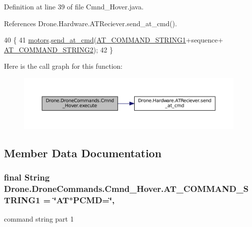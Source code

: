 Definition at line 39 of file Cmnd\+\_\+\+Hover.\+java.



References Drone.\+Hardware.\+A\+T\+Reciever.\+send\+\_\+at\+\_\+cmd().


\begin{DoxyCode}
40     \{
41         \hyperlink{class_drone_1_1_drone_commands_1_1_cmnd___hover_ac1a7b5271784b61c9f20d811fcdac401}{motors}.\hyperlink{class_drone_1_1_hardware_1_1_a_t_reciever_a93352d75209626cf62bde294b35f9120}{send\_at\_cmd}(\hyperlink{class_drone_1_1_drone_commands_1_1_cmnd___hover_a20441bc1e48cb90f898f805410872766}{AT\_COMMAND\_STRING1}+sequence+
      \hyperlink{class_drone_1_1_drone_commands_1_1_cmnd___hover_a617bce0e87944c82c0a1199d405d5301}{AT\_COMMAND\_STRING2});
42     \}
\end{DoxyCode}


Here is the call graph for this function\+:\nopagebreak
\begin{figure}[H]
\begin{center}
\leavevmode
\includegraphics[width=350pt]{class_drone_1_1_drone_commands_1_1_cmnd___hover_a420a0efbfd9a7872eac0cf8174b993bd_cgraph}
\end{center}
\end{figure}




\subsection{Member Data Documentation}
\hypertarget{class_drone_1_1_drone_commands_1_1_cmnd___hover_a20441bc1e48cb90f898f805410872766}{}
\subsubsection[{A\+T\+\_\+\+C\+O\+M\+M\+A\+N\+D\+\_\+\+S\+T\+R\+I\+N\+G1}]{\setlength{\rightskip}{0pt plus 5cm}final String Drone.\+Drone\+Commands.\+Cmnd\+\_\+\+Hover.\+A\+T\+\_\+\+C\+O\+M\+M\+A\+N\+D\+\_\+\+S\+T\+R\+I\+N\+G1 = \char`\"{}A\+T$\ast$P\+C\+M\+D=\char`\"{}\hspace{0.3cm}{\ttfamily [static]}, {\ttfamily [private]}}\label{class_drone_1_1_drone_commands_1_1_cmnd___hover_a20441bc1e48cb90f898f805410872766}
command string part 1 

